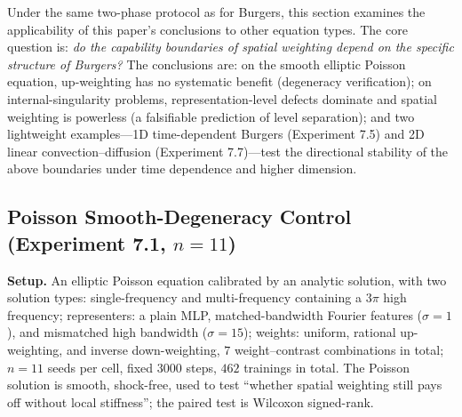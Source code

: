 \documentclass[11pt]{article}
\numberwithin{equation}{section}
\begin{document}
Under the same two-phase protocol as for Burgers, this section examines the applicability of this paper's conclusions to other equation types. The core question is: \emph{do the capability boundaries of spatial weighting depend on the specific structure of Burgers?} The conclusions are: on the smooth elliptic Poisson equation, up-weighting has no systematic benefit (degeneracy verification); on internal-singularity problems, representation-level defects dominate and spatial weighting is powerless (a falsifiable prediction of level separation); and two lightweight examples---1D time-dependent Burgers (Experiment 7.5) and 2D linear convection--diffusion (Experiment 7.7)---test the directional stability of the above boundaries under time dependence and higher dimension.

\subsection{Poisson Smooth-Degeneracy Control (Experiment 7.1, $n=11$)}\label{sec:s2a}

\textbf{Setup.} An elliptic Poisson equation calibrated by an analytic solution, with two solution types: single-frequency and multi-frequency containing a $3\pi$ high frequency; representers: a plain MLP, matched-bandwidth Fourier features ($\sigma=1$), and mismatched high bandwidth ($\sigma=15$); weights: uniform, rational up-weighting, and inverse down-weighting, $7$ weight--contrast combinations in total; $n=11$ seeds per cell, fixed $3000$ steps, $462$ trainings in total. The Poisson solution is smooth, shock-free, used to test ``whether spatial weighting still pays off without local stiffness''; the paired test is Wilcoxon signed-rank.
\end{document}
